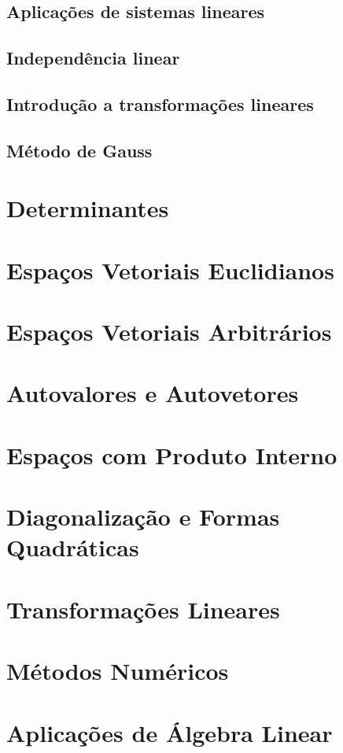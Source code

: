 \subsection{Aplicações de sistemas lineares}
\subsection{Independência linear}
\subsection{Introdução a transformações lineares}
\subsection{Método de Gauss}

\section{Determinantes}
\section{Espaços Vetoriais Euclidianos}
\section{Espaços Vetoriais Arbitrários}
\section{Autovalores e Autovetores}
\section{Espaços com Produto Interno}
\section{Diagonalização e Formas Quadráticas}
\section{Transformações Lineares}
\section{Métodos Numéricos}
\section{Aplicações de Álgebra Linear}
